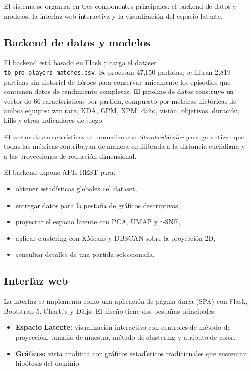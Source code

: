 \documentclass[conference]{IEEEtran}
\begin{document}
El sistema se organiza en tres componentes principales: el backend de datos y modelos, la interfaz web interactiva y la visualización del espacio latente.

\subsection{Backend de datos y modelos}

El backend está basado en Flask y carga el dataset \texttt{tb\_pro\_players\_matches.csv}. Se procesan 47{,}150 partidas; se filtran 2{,}819 partidas sin historial de héroes para conservar únicamente los episodios que contienen datos de rendimiento completos. El pipeline de datos construye un vector de 66 características por partida, compuesto por métricas históricas de ambos equipos: win rate, KDA, GPM, XPM, daño, visión, objetivos, duración, kills y otros indicadores de juego.

El vector de características se normaliza con \textit{StandardScaler} para garantizar que todas las métricas contribuyan de manera equilibrada a la distancia euclidiana y a las proyecciones de reducción dimensional.

El backend expone APIs REST para:

\begin{itemize}
  \item obtener estadísticas globales del dataset,
  \item entregar datos para la pestaña de gráficos descriptivos,
  \item proyectar el espacio latente con PCA, UMAP y t-SNE,
  \item aplicar clustering con KMeans y DBSCAN sobre la proyección 2D,
  \item consultar detalles de una partida seleccionada.
\end{itemize}

\subsection{Interfaz web}

La interfaz se implementa como una aplicación de página única (SPA) con Flask, Bootstrap 5, Chart.js y D3.js. El diseño tiene dos pestañas principales:

\begin{itemize}
  \item \textbf{Espacio Latente:} visualización interactiva con controles de método de proyección, tamaño de muestra, método de clustering y atributo de color.
  \item \textbf{Gráficos:} vista analítica con gráficos estadísticos tradicionales que sustentan hipótesis del dominio.
\end{itemize}
\end{document}
